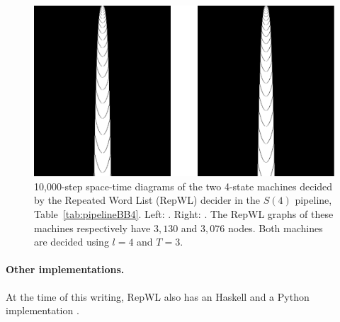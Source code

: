 \begin{figure}
    \centering
    \includegraphics[scale=0.48]{figures/RepWL/RepWL_BB4_two_machines.pdf}
    \caption{10,000-step space-time diagrams of the two 4-state machines decided by the Repeated Word List (RepWL) decider in the $S(4)$ pipeline, Table~\ref{tab:pipelineBB4}. Left: {\small {}}. Right: {\small {}}. The RepWL graphs of these machines respectively have $3{,}130$ and $3{,}076$ nodes. Both machines are decided using $l=4$ and $T=3$.
    }\label{fig:RepWLBB4}
\end{figure}

\paragraph{Other implementations.} At the time of this writing, RepWL also has an Haskell and a Python implementation \cite{RepWL_haskell,RepWL_python}.